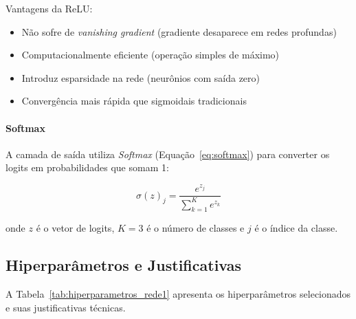Vantagens da ReLU:
\begin{itemize}
    \item Não sofre de \textit{vanishing gradient} (gradiente desaparece em redes profundas)
    \item Computacionalmente eficiente (operação simples de máximo)
    \item Introduz esparsidade na rede (neurônios com saída zero)
    \item Convergência mais rápida que sigmoidais tradicionais \cite{glorot2011deep}
\end{itemize}

\paragraph{Softmax}

A camada de saída utiliza \textit{Softmax} (Equação~\ref{eq:softmax}) para converter os logits em probabilidades que somam 1:

\begin{equation}
\label{eq:softmax}
\sigma(z)_j = \frac{e^{z_j}}{\sum_{k=1}^{K} e^{z_k}}
\end{equation}

onde $z$ é o vetor de logits, $K=3$ é o número de classes e $j$ é o índice da classe.

\subsection{Hiperparâmetros e Justificativas}

A Tabela~\ref{tab:hiperparametros_rede1} apresenta os hiperparâmetros selecionados e suas justificativas técnicas.

